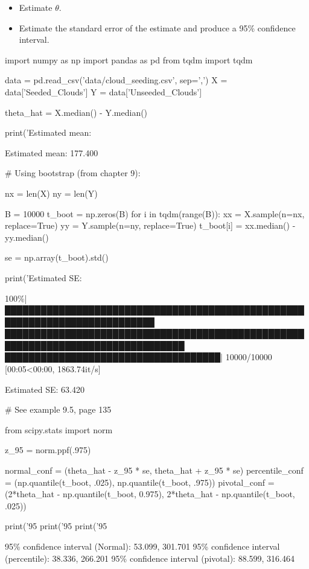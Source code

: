 \begin{itemize}[tightlist]
\item
  Estimate \(\theta\).
\item
  Estimate the standard error of the estimate and produce a 95\%
  confidence interval.
\end{itemize}

\begin{python}
import numpy as np
import pandas as pd
from tqdm import tqdm

data = pd.read_csv('data/cloud_seeding.csv', sep=',')
X = data['Seeded_Clouds']
Y = data['Unseeded_Clouds']
\end{python}

\begin{python}
theta_hat = X.median() - Y.median()

print('Estimated mean: %
\end{python}

\begin{console}
Estimated mean: 177.400
\end{console}

\begin{python}
# Using bootstrap (from chapter 9):

nx = len(X)
ny = len(Y)

B = 10000
t_boot = np.zeros(B)
for i in tqdm(range(B)):
    xx = X.sample(n=nx, replace=True)
    yy = Y.sample(n=ny, replace=True)
    t_boot[i] = xx.median() - yy.median()
    
se = np.array(t_boot).std()

print('Estimated SE: %
\end{python}

\begin{console}
100\%|███████████████████████████████████████████████████████████████████████████
████████████████████████████████████████████████████████████████████████████████
████████████████████████████████████| 10000/10000 [00:05<00:00, 1863.74it/s]
\end{console}

\begin{console}
Estimated SE: 63.420
\end{console}

\begin{python}
# See example 9.5, page 135

from scipy.stats import norm

z_95 = norm.ppf(.975)

normal_conf = (theta_hat - z_95 * se, theta_hat + z_95 * se)
percentile_conf = (np.quantile(t_boot, .025), np.quantile(t_boot, .975))
pivotal_conf = (2*theta_hat - np.quantile(t_boot, 0.975), 2*theta_hat - np.quantile(t_boot, .025))

print('95%
print('95%
print('95%
\end{python}

\begin{console}
95\% confidence interval (Normal):        53.099, 301.701
95\% confidence interval (percentile):    38.336, 266.201
95\% confidence interval (pivotal):       88.599, 316.464
\end{console}
